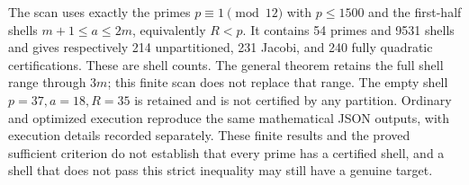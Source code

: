 The scan uses exactly the primes $p\equiv1\pmod{12}$ with $p\leq1500$
and the first-half shells $m+1\leq a\leq2m$, equivalently $R<p$.
It contains 54 primes and 9531 shells and gives respectively
214 unpartitioned, 231 Jacobi, and 240 fully quadratic certifications.
These are shell counts. The general theorem retains the full shell
range through $3m$; this finite scan does not replace that range.
The empty shell $p=37,a=18,R=35$ is retained and is not certified by
any partition. Ordinary and optimized execution reproduce the same
mathematical JSON outputs, with execution details recorded separately.
These finite results and the proved sufficient criterion do not
establish that every prime has a certified shell, and a shell that
does not pass this strict inequality may still have a genuine target.
